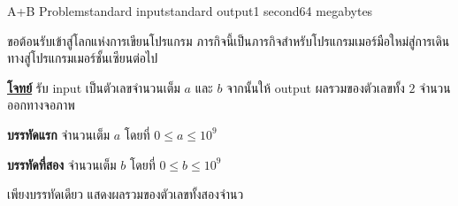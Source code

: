 \documentclass[11pt,a4paper]{article}
\begin{document}
\begin{problem}{A+B Problem}{standard input}{standard output}{1 second}{64 megabytes}

ขอต้อนรับเข้าสู่โลกแห่งการเขียนโปรแกรม ภารกิจนี้เป็นภารกิจสำหรับโปรแกรมเมอร์มือใหม่สู่การเดินทางสู่โปรแกรมเมอร์ชั้นเซียนต่อไป

\underline{\textbf{โจทย์}} รับ input เป็นตัวเลขจำนวนเต็ม $a$ และ $b$ จากนั้นให้ output ผลรวมของตัวเลขทั้ง $2$ จำนวนออกทางจอภาพ

\InputFile

\textbf{บรรทัดแรก} จำนวนเต็ม $a$ โดยที่ $0 \leq a \leq 10^9$

\textbf{บรรทัดที่สอง} จำนวนเต็ม $b$ โดยที่ $0 \leq b \leq 10^9$

\OutputFile

เพียงบรรทัดเดียว แสดงผลรวมของตัวเลขทั้งสองจำนว

\Examples

\begin{example}
%
\end{example}

\end{problem}
\end{document}
